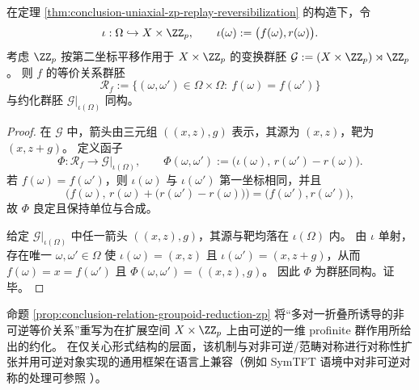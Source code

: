 \begin{proposition}[等价关系群胚的单轴可逆化约化]\label{prop:conclusion-relation-groupoid-reduction-zp}
在定理 \ref{thm:conclusion-uniaxial-zp-replay-reversibilization} 的构造下，令
\[
\iota:\Omega\hookrightarrow X\times \ZZ_p,\qquad \iota(\omega):=\bigl(f(\omega),r(\omega)\bigr).
\]
考虑 \(\ZZ_p\) 按第二坐标平移作用于 \(X\times \ZZ_p\) 的变换群胚
\(
\mathcal{G}:=(X\times \ZZ_p)\rtimes \ZZ_p
\)。
则 \(f\) 的等价关系群胚
\[
\mathcal{R}_f:=\{(\omega,\omega')\in\Omega\times\Omega:\ f(\omega)=f(\omega')\}
\]
与约化群胚 \(\mathcal{G}|_{\iota(\Omega)}\) 同构。
\end{proposition}
\begin{proof}
在 \(\mathcal{G}\) 中，箭头由三元组 \(((x,z),g)\) 表示，其源为 \((x,z)\)，靶为 \((x,z+g)\)。
定义函子
\[
\Phi:\mathcal{R}_f\to \mathcal{G}|_{\iota(\Omega)},\qquad
\Phi(\omega,\omega'):=\bigl(\iota(\omega),\,r(\omega')-r(\omega)\bigr).
\]
若 \(f(\omega)=f(\omega')\)，则 \(\iota(\omega)\) 与 \(\iota(\omega')\) 第一坐标相同，并且
\[
\bigl(f(\omega),\,r(\omega)+\bigl(r(\omega')-r(\omega)\bigr)\bigr)=\bigl(f(\omega'),r(\omega')\bigr),
\]
故 \(\Phi\) 良定且保持单位与合成。
\par
给定 \(\mathcal{G}|_{\iota(\Omega)}\) 中任一箭头 \(((x,z),g)\)，其源与靶均落在 \(\iota(\Omega)\) 内。
由 \(\iota\) 单射，存在唯一 \(\omega,\omega'\in\Omega\) 使 \(\iota(\omega)=(x,z)\) 且 \(\iota(\omega')=(x,z+g)\)，从而 \(f(\omega)=x=f(\omega')\) 且 \(\Phi(\omega,\omega')=((x,z),g)\)。
因此 \(\Phi\) 为群胚同构。证毕。
\end{proof}

\begin{remark}[与对称性扩张的形式接口]\label{rem:conclusion-zp-reversibilization-symmetry-extension}
命题 \ref{prop:conclusion-relation-groupoid-reduction-zp} 将“多对一折叠所诱导的非可逆等价关系”重写为在扩展空间 \(X\times \ZZ_p\) 上由可逆的一维 profinite 群作用所给出的约化。
在仅关心形式结构的层面，该机制与对非可逆/范畴对称进行对称性扩张并用可逆对象实现的通用框架在语言上兼容（例如 SymTFT 语境中对非可逆对称的处理可参照 \cite{SchaferNamekiTiwariWarmanZhang2025SymTFTMixedStatesNonInvertible}）。
\end{remark}

